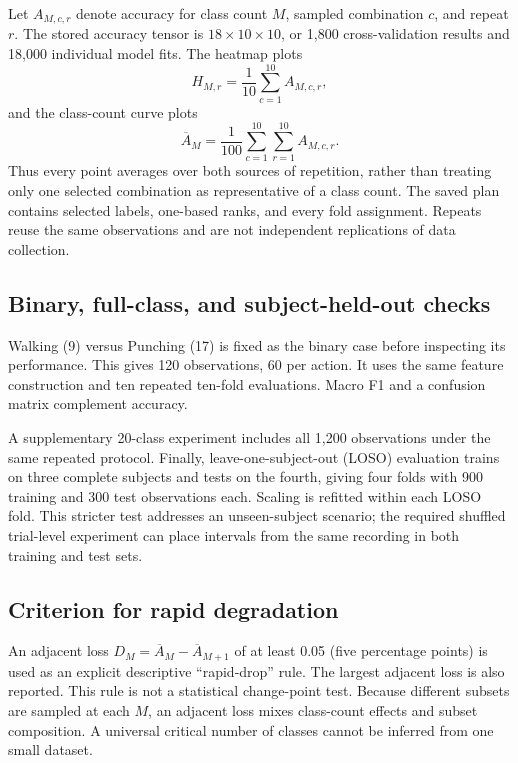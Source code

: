 \documentclass[journal]{IEEEtran}
\begin{document}
Let $A_{M,c,r}$ denote accuracy for class count $M$, sampled combination $c$, and repeat $r$. The stored accuracy tensor is $18\times10\times10$, or 1,800 cross-validation results and 18,000 individual model fits. The heatmap plots
\begin{equation}
H_{M,r}=\frac{1}{10}\sum_{c=1}^{10} A_{M,c,r},
\end{equation}
and the class-count curve plots
\begin{equation}
\overline A_M=\frac{1}{100}\sum_{c=1}^{10}\sum_{r=1}^{10} A_{M,c,r}.
\end{equation}
Thus every point averages over both sources of repetition, rather than treating only one selected combination as representative of a class count. The saved plan contains selected labels, one-based ranks, and every fold assignment. Repeats reuse the same observations and are not independent replications of data collection.

\subsection{Binary, full-class, and subject-held-out checks}
Walking (9) versus Punching (17) is fixed as the binary case before inspecting its performance. This gives 120 observations, 60 per action. It uses the same feature construction and ten repeated ten-fold evaluations. Macro F1 and a confusion matrix complement accuracy.

A supplementary 20-class experiment includes all 1,200 observations under the same repeated protocol. Finally, leave-one-subject-out (LOSO) evaluation trains on three complete subjects and tests on the fourth, giving four folds with 900 training and 300 test observations each. Scaling is refitted within each LOSO fold. This stricter test addresses an unseen-subject scenario; the required shuffled trial-level experiment can place intervals from the same recording in both training and test sets.

\subsection{Criterion for rapid degradation}
An adjacent loss $D_M=\overline A_M-\overline A_{M+1}$ of at least 0.05 (five percentage points) is used as an explicit descriptive ``rapid-drop'' rule. The largest adjacent loss is also reported. This rule is not a statistical change-point test. Because different subsets are sampled at each $M$, an adjacent loss mixes class-count effects and subset composition. A universal critical number of classes cannot be inferred from one small dataset.
\end{document}
